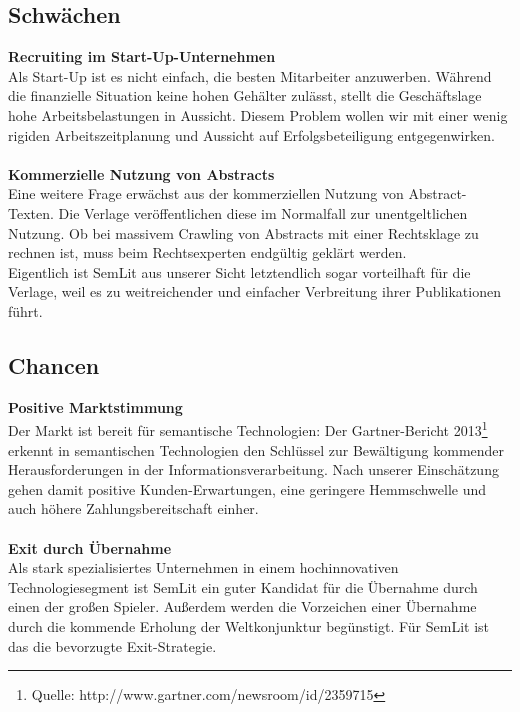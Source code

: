 \subsection{Schwächen}
\textbf{Recruiting im Start-Up-Unternehmen}\\
Als Start-Up ist es nicht einfach, die besten Mitarbeiter anzuwerben. Während die finanzielle Situation keine hohen Gehälter zulässt, stellt die Geschäftslage hohe Arbeitsbelastungen in Aussicht. Diesem Problem wollen wir mit einer wenig rigiden Arbeitszeitplanung und Aussicht auf Erfolgsbeteiligung entgegenwirken. 
\\
\\
\textbf{Kommerzielle Nutzung von Abstracts}\\
Eine weitere Frage erwächst aus der kommerziellen Nutzung von Abstract-Texten. Die Verlage veröffentlichen diese im Normalfall zur unentgeltlichen Nutzung. Ob bei massivem Crawling von Abstracts mit einer Rechtsklage zu rechnen ist, muss beim Rechtsexperten endgültig geklärt werden. \\
Eigentlich ist SemLit aus unserer Sicht letztendlich sogar vorteilhaft für die Verlage, weil es zu weitreichender und einfacher Verbreitung ihrer Publikationen führt.

\subsection{Chancen}
\textbf{Positive Marktstimmung}\\
Der Markt ist bereit für semantische Technologien: Der Gartner-Bericht 2013\footnote[5]{Quelle: http://www.gartner.com/newsroom/id/2359715} erkennt in semantischen Technologien den Schlüssel zur Bewältigung kommender Herausforderungen in der Informationsverarbeitung. Nach unserer Einschätzung gehen damit positive Kunden-Erwartungen, eine geringere Hemmschwelle und auch höhere Zahlungsbereitschaft einher.
\\
\\
\textbf{Exit durch Übernahme}\\
Als stark spezialisiertes Unternehmen in einem hochinnovativen Technologiesegment ist SemLit ein guter Kandidat für die Übernahme durch einen der großen Spieler. Außerdem werden die Vorzeichen einer Übernahme durch die kommende Erholung der Weltkonjunktur begünstigt. Für SemLit ist das die bevorzugte Exit-Strategie.

